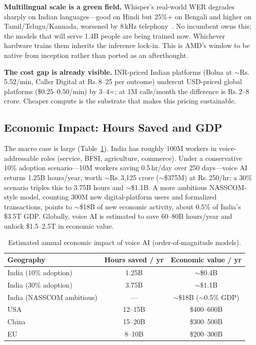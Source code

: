 \documentclass[blind]{gtac}
\providecommand{\rupee}{\ensuremath{\text{\rm\textsf{R}}}} %
\renewcommand{\rupee}{Rs.\,} %
\begin{document}
\textbf{Multilingual scale is a green field.} Whisper's real-world WER degrades sharply on Indian languages---good on Hindi but 25\%+ on Bengali and higher on Tamil/Telugu/Kannada, worsened by 8\,kHz telephony~\cite{whisper_wer,indic_asr}. No incumbent owns this; the models that will serve 1.4B people are being trained now. Whichever hardware trains them inherits the inference lock-in. This is AMD's window to be native from inception rather than ported as an afterthought.

\textbf{The cost gap is already visible.} INR-priced Indian platforms (Bolna at $\sim$\rupee 5.52/min, Caller Digital at \rupee 8--25 per outcome) undercut USD-priced global platforms (\$0.25--0.50/min) by 3--4$\times$; at 1M calls/month the difference is \rupee 2--8 crore. Cheaper compute is the substrate that makes this pricing sustainable.

\subsection{Economic Impact: Hours Saved and GDP}

The macro case is large (Table~\ref{tab:gdp}). India has roughly 100M workers in voice-addressable roles (service, BFSI, agriculture, commerce). Under a conservative 10\% adoption scenario---10M workers saving 0.5\,hr/day over 250 days---voice AI returns 1.25B hours/year, worth $\sim$\rupee 3{,}125 crore ($\sim$\$375M) at \rupee 250/hr; a 30\% scenario triples this to 3.75B hours and $\sim$\$1.1B. A more ambitious NASSCOM-style model, counting 300M new digital-platform users and formalized transactions, points to $\sim$\$18B of new economic activity, about 0.5\% of India's \$3.5T GDP. Globally, voice AI is estimated to save 60--80B hours/year and unlock \$1.5--2.5T in economic value.

\begin{table}[H]
\centering
\caption{Estimated annual economic impact of voice AI (order-of-magnitude models).}
\label{tab:gdp}
\tiny
\begin{tabular}{@{}lcc@{}}
\toprule
Geography & Hours saved / yr & Economic value / yr \\
\midrule
India (10\% adoption) & 1.25B & $\sim$\$0.4B \\
India (30\% adoption) & 3.75B & $\sim$\$1.1B \\
India (NASSCOM ambitious) & --- & $\sim$\$18B ($\sim$0.5\% GDP) \\
USA & 12--15B & \$400--600B \\
China & 15--20B & \$300--500B \\
EU & 8--10B & \$200--300B \\
\bottomrule
\end{tabular}
\end{table}
\end{document}
